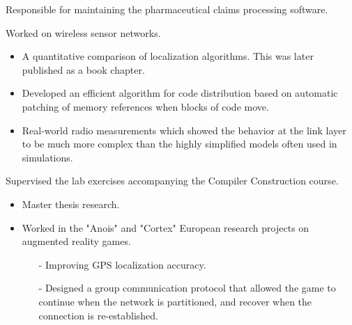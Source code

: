 \documentclass[10pt,a4paper]{../altacv}
\begin{document}
	\medskip
	

	\medskip

	Responsible for maintaining the pharmaceutical claims processing software.

	\medskip
	
	
	\newpage


	\bigskip\bigskip{}
	
	Worked on wireless sensor networks.
	
	\medskip
	
	\begin{itemize}
		\item\small A quantitative comparison of localization algorithms. This was later published as a book chapter.
		\smallskip
		\item\small Developed an efficient algorithm for code distribution based on automatic patching of memory references when blocks of code move.
		\smallskip
		\item\small Real-world radio measurements which showed the behavior at the link layer to be much more complex than the highly simplified models often used in simulations.
	\end{itemize}
	
	\medskip
	
	Supervised the lab exercises accompanying the Compiler Construction course.
	
	\medskip
	
	
	
	\bigskip\bigskip{}
	
	\begin{itemize}
		\item Master thesis research.
		\smallskip
		\item Worked in the "Anois" and "Cortex" European research projects on augmented reality games.
		\begin{itemize}
			\item[-] Improving GPS localization accuracy.
			\item[-] Designed a group communication protocol that allowed the game to continue when the network is partitioned, and recover when the connection is re-established.
		\end{itemize}
	\end{itemize}
	
\end{document}
